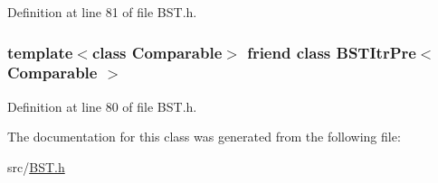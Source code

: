 Definition at line 81 of file B\-S\-T.\-h.

\hypertarget{class_b_s_t_a45a55df6f11541416d4ea7684c575c1a}{
\subsubsection[{B\-S\-T\-Itr\-Pre$<$ Comparable $>$}]{\setlength{\rightskip}{0pt plus 5cm}template$<$class Comparable$>$ friend class {\bf B\-S\-T\-Itr\-Pre}$<$ Comparable $>$\hspace{0.3cm}{\ttfamily [friend]}}}\label{class_b_s_t_a45a55df6f11541416d4ea7684c575c1a}


Definition at line 80 of file B\-S\-T.\-h.



The documentation for this class was generated from the following file\-:\begin{DoxyCompactItemize}
\item 
src/\hyperlink{_b_s_t_8h}{B\-S\-T.\-h}\end{DoxyCompactItemize}
